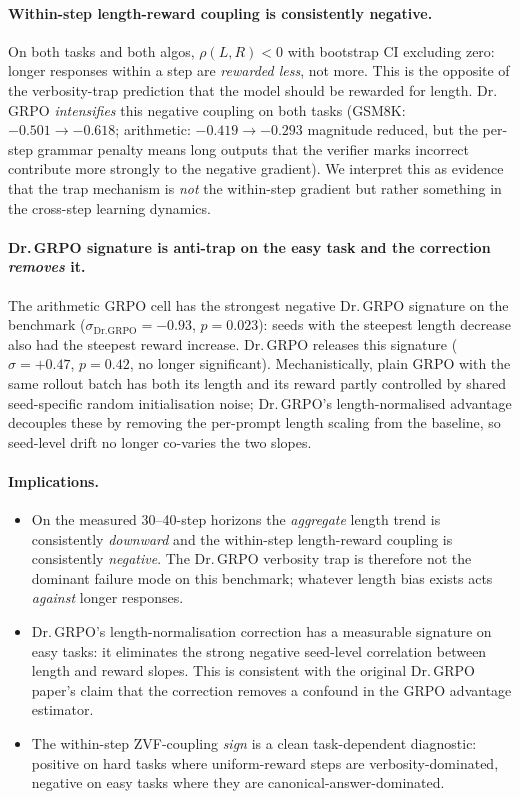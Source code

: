 \documentclass{article}
\begin{document}
\paragraph{Within-step length-reward coupling is consistently negative.}
On both tasks and both algos, $\rho(L, R) < 0$ with bootstrap CI excluding
zero: longer responses within a step are \emph{rewarded less}, not more.
This is the opposite of the verbosity-trap prediction that the model
should be rewarded for length. Dr.\,GRPO \emph{intensifies} this negative
coupling on both tasks (GSM8K: $-0.501 \to -0.618$; arithmetic:
$-0.419 \to -0.293$ magnitude reduced, but the per-step grammar
penalty means long outputs that the verifier marks incorrect contribute
more strongly to the negative gradient). We interpret this as evidence
that the trap mechanism is \emph{not} the within-step gradient but
rather something in the cross-step learning dynamics.

\paragraph{Dr.\,GRPO signature is anti-trap on the easy task and the
correction \emph{removes} it.}
The arithmetic GRPO cell has the strongest negative Dr.\,GRPO signature
on the benchmark ($\sigma_{\mathrm{Dr.GRPO}} = -0.93$, $p = 0.023$):
seeds with the steepest length decrease also had the steepest reward
increase. Dr.\,GRPO releases this signature ($\sigma = +0.47$, $p = 0.42$,
no longer significant). Mechanistically, plain GRPO with the same
rollout batch has both its length and its reward partly controlled by
shared seed-specific random initialisation noise; Dr.\,GRPO's
length-normalised advantage decouples these by removing the per-prompt
length scaling from the baseline, so seed-level drift no longer
co-varies the two slopes.

\paragraph{Implications.}
\begin{itemize}
\item On the measured 30--40-step horizons the \emph{aggregate} length
  trend is consistently \emph{downward} and the within-step length-reward
  coupling is consistently \emph{negative}. The Dr.\,GRPO verbosity trap
  is therefore not the dominant failure mode on this benchmark;
  whatever length bias exists acts \emph{against} longer responses.
\item Dr.\,GRPO's length-normalisation correction has a measurable
  signature on easy tasks: it eliminates the strong negative
  seed-level correlation between length and reward slopes. This is
  consistent with the original Dr.\,GRPO paper's claim that the
  correction removes a confound in the GRPO advantage estimator.
\item The within-step ZVF-coupling \emph{sign} is a clean task-dependent
  diagnostic: positive on hard tasks where uniform-reward steps are
  verbosity-dominated, negative on easy tasks where they are
  canonical-answer-dominated.
\end{itemize}
\end{document}
